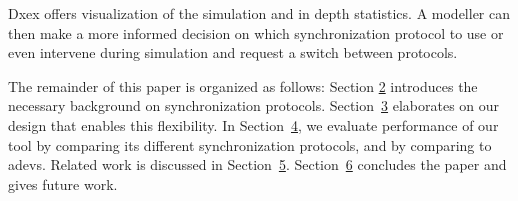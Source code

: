 Dxex offers visualization of the simulation and in depth statistics. A modeller can then make a more informed decision on which synchronization protocol to use or even intervene during simulation and request a switch between protocols. 

The remainder of this paper is organized as follows:
Section \hyperref[sec:2-background]{2} introduces the necessary background on synchronization protocols.
Section~\hyperref[sec:3-features]{3} elaborates on our design that enables this flexibility.
In Section~\hyperref[sec:4-performance]{4}, we evaluate performance of our tool by comparing its different synchronization protocols, and by comparing to adevs.
Related work is discussed in Section~\hyperref[sec:5-related-work]{5}.
Section~\hyperref[sec:6-conclusion]{6} concludes the paper and gives future work.
